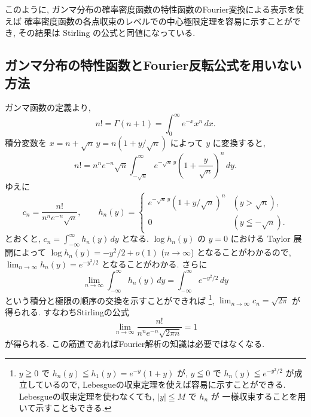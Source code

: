 \documentclass[12pt,twoside]{jarticle}
\theoremstyle{jplain}
\theoremstyle{jplain}
\theoremstyle{jplain}
\numberwithin{theorem}{section}
\numberwithin{equation}{section}
\numberwithin{figure}{section}
\numberwithin{table}{section}
\begin{document}
このように, 
ガンマ分布の確率密度函数の特性函数のFourier変換による表示を使えば
確率密度函数の各点収束のレベルでの中心極限定理を容易に示すことができ,
その結果は Stirling の公式と同値になっている.


\subsection{ガンマ分布の特性函数とFourier反転公式を用いない方法}
\label{sec:pconv-2}

ガンマ函数の定義より,
\[
n! = \Gamma(n+1)=\int_0^\infty e^{-x} x^n\,dx.
\]
積分変数を $x=n+\sqrt{n}\,y=n(1+y/\sqrt{n})$ によって $y$ に変換すると, 
\[
n! = n^n e^{-n}\sqrt{n} \int_{-\sqrt{n}}^\infty e^{-\sqrt{n}\,y}\left(1+\frac{y}{\sqrt{n}}\right)^n\,dy. 
\]
ゆえに
\[
c_n = \frac{n!}{n^n e^{-n}\sqrt{n}}, 
\qquad
h_n(y) = 
\begin{cases}
e^{-\sqrt{n}\,y}(1+y/\sqrt{n})^n & (y>\sqrt{n}), \\
0 & (y\leqq -\sqrt{n}).
\end{cases}
\]
とおくと, $c_n=\int_{-\infty}^\infty h_n(y)\,dy$ となる.
$\log h_n(y)$ の $y=0$ における Taylor 展開によって
$\log h_n(y) = -y^2/2 + o(1)$ ($n\to\infty$)
となることがわかるので,  $\lim_{n\to\infty} h_n(y)=e^{-y^2/2}$ となることがわかる.
さらに
\[
  \lim_{n\to\infty}\int_{-\infty}^\infty h_n(y)\,dy
 =\int_{-\infty}^\infty e^{-y^2/2}\,dy
\]
という積分と極限の順序の交換を示すことができれば%
\footnote{$y\geqq 0$ で $h_n(y)\leqq h_1(y)=e^{-y}(1+y)$ が, 
$y\leqq 0$ で $h_n(y)\leqq e^{-y^2/2}$ が成立しているので, 
Lebesgueの収束定理を使えば容易に示すことができる.
Lebesgueの収束定理を使わなくても, $|y|\leqq M$ で $h_n$ が
一様収束することを用いて示すこともできる.}, 
$\lim_{n\to\infty}c_n=\sqrt{2\pi}$ が得られる. すなわちStirlingの公式
\[
\lim_{n\to\infty} \frac{n!}{n^n e^{-n} \sqrt{2\pi n}}=1
\]
が得られる.  この筋道であればFourier解析の知識は必要ではなくなる.
\end{document}
